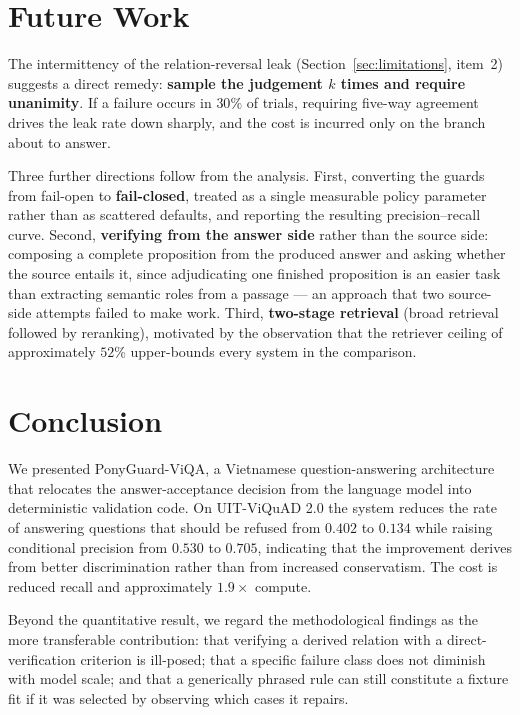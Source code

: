 \documentclass[conference]{IEEEtran}
\begin{document}
\section{Future Work}

The intermittency of the relation-reversal leak
(Section~\ref{sec:limitations}, item~2) suggests a direct remedy:
\textbf{sample the judgement $k$ times and require unanimity}. If a failure occurs
in $30\%$ of trials, requiring five-way agreement drives the leak rate down
sharply, and the cost is incurred only on the branch about to answer.

Three further directions follow from the analysis. First, converting the guards
from fail-open to \textbf{fail-closed}, treated as a single measurable policy
parameter rather than as scattered defaults, and reporting the resulting
precision--recall curve. Second, \textbf{verifying from the answer side} rather
than the source side: composing a complete proposition from the produced answer
and asking whether the source entails it, since adjudicating one finished
proposition is an easier task than extracting semantic roles from a passage ---
an approach that two source-side attempts failed to make work. Third,
\textbf{two-stage retrieval} (broad retrieval followed by reranking), motivated by
the observation that the retriever ceiling of approximately $52\%$ upper-bounds
every system in the comparison.

\section{Conclusion}

We presented PonyGuard-ViQA, a Vietnamese question-answering architecture that
relocates the answer-acceptance decision from the language model into
deterministic validation code. On UIT-ViQuAD 2.0 the system reduces the rate of
answering questions that should be refused from $0.402$ to $0.134$ while raising
conditional precision from $0.530$ to $0.705$, indicating that the improvement
derives from better discrimination rather than from increased conservatism. The
cost is reduced recall and approximately $1.9\times$ compute.

Beyond the quantitative result, we regard the methodological findings as the more
transferable contribution: that verifying a derived relation with a
direct-verification criterion is ill-posed; that a specific failure class does not
diminish with model scale; and that a generically phrased rule can still
constitute a fixture fit if it was selected by observing which cases it repairs.
\end{document}
